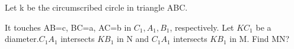 Let k be the circumscribed circle in triangle ABC.

It touches AB=c, BC=a, AC=b in $ C_1, A_1, B_1 $,  respectively. Let  $ KC_1 $ be a diameter.$ C_1A_1 $ intersects  $ KB_1 $ in N and  $ C_1A_1 $ intersects  $ KB_1 $ in M. Find MN?